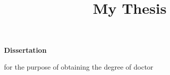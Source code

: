 \documentclass{tudelft}
\title{My Thesis}
\author{}
\date{}
\begin{document}

\frontmatter

\begin{titlepage}

    \begin{center}

        \vspace*{2\bigskipamount}

        {\makeatletter
            \titlestyle\bfseries\LARGE\@title
            \makeatother}

        {\makeatletter
            \ifx\@subtitle\undefined\else
                \bigskip
                \titlefont\titleshape\Large\@subtitle
            \fi
            \makeatother}

    \end{center}

    \cleardoublepage
    \thispagestyle{empty}

    \begin{center}


        \vspace*{2\bigskipamount}

        {\makeatletter
            \titlestyle\bfseries\LARGE\@title
            \makeatother}

        {\makeatletter
            \ifx\@subtitle\undefined\else
                \bigskip
                \titlefont\titleshape\Large\@subtitle
            \fi
            \makeatother}

        \vfill


        {\Large\titlefont\bfseries Dissertation}

        \bigskip
        \bigskip

        for the purpose of obtaining the degree of doctor


\end{center}
\end{titlepage}
\end{document}
